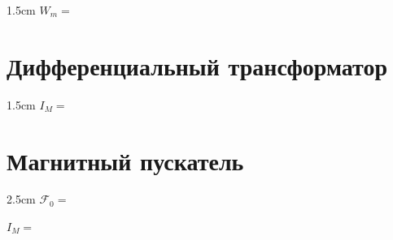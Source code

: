 \begin{answerbox}{1.5cm}
\(W_m=\)
\end{answerbox}

\part{Дифференциальный трансформатор}

\begin{answerbox}{1.5cm}
\(I_M=\)
\end{answerbox}

\part{Магнитный пускатель}

\begin{answerbox}{2.5cm}
\(\mathcal F_0=\)

\bigskip

\(I_M=\)
\end{answerbox}
